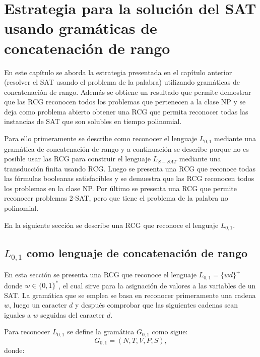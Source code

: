 \chapter{Estrategia para la solución del SAT usando gramáticas de concatenación de rango}
\label{chap:LSATRCG}

En este capítulo se aborda la estrategia presentada en el capítulo anterior (resolver el SAT usando el problema
de la palabra) utilizando gramáticas de concatenación de rango. Además se obtiene un resultado que permite
demostrar que las RCG reconocen todos los problemas que pertenecen a la clase NP y se deja como problema
abierto obtener una RCG que permita reconocer todas las instancias de SAT que son solubles en tiempo polinomial.

Para ello primeramente se describe como reconocer el lenguaje $L_{0,1}$ mediante una gramática de concatenación
de rango y a continuación se describe porque no es posible usar las RCG para construir el lenguaje $L_{S-SAT}$
mediante una transducción finita usando RCG. Luego se presenta una RCG que reconoce todas las fórmulas booleanas
satisfacibles y se demuestra que las RCG reconocen todos los problemas en la clase NP. Por último se presenta una
RCG que permite reconocer problemas 2-SAT, pero que tiene el problema de la palabra no polinomial.

En la siguiente sección se describe una RCG que reconoce el lenguaje $L_{0,1}$.

\section{$L_{0,1}$ como lenguaje de concatenación de rango}

En esta sección se presenta una RCG que reconoce el lenguaje $L_{0,1}=\{wd\}^+$ donde $w\in \{0,1\}^*$, el cual sirve para la asignación
de valores a las variables de un SAT. La gramática que se emplea se basa en reconocer primeramente
una cadena $w$, luego un caracter $d$ y después comprobar que las siguientes cadenas sean iguales a $w$
seguidas del caracter $d$.

Para reconocer $L_{0,1}$ se define la gramática $G_{0,1}$ como sigue:
\[
    G_{0,1} = (N, T, V, P, S),
\]
donde:

